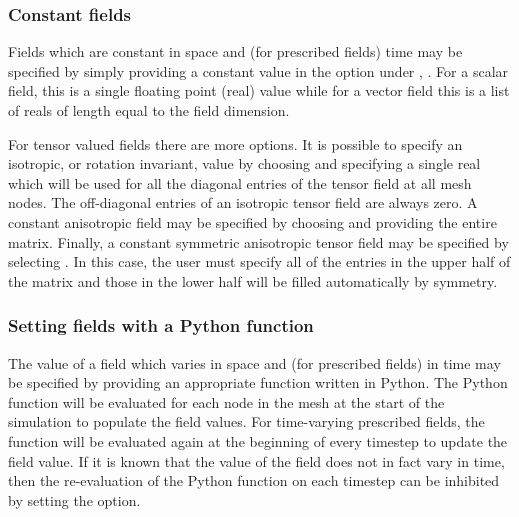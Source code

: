 \subsubsection{Constant fields}
Fields which are constant in space and (for prescribed fields) time may be
specified by simply providing a constant value in the 
option under ,
. For a scalar field, this is a single
floating point (real) value while for a vector field this is a list of reals
of length equal to the field dimension.

For tensor valued fields there are more options. It is possible to specify
an isotropic, or rotation invariant, value by choosing
 and specifying a single real which
will be used for all the diagonal entries of the tensor field at all mesh
nodes. The off-diagonal entries of an isotropic tensor field are always
zero. A constant anisotropic field may be specified by choosing
 and providing the
entire matrix. Finally, a constant symmetric anisotropic tensor field may be
specified by selecting \onlypdf\linebreak
{}. In this case, the
user must specify all of the entries in the upper half of the matrix and
those in the lower half will be filled automatically by symmetry.

\subsubsection{Setting fields with a Python function}\label{Sect:setting_with_python}
The value of a field which varies in space and (for prescribed fields) in
time may be specified by providing an appropriate function written in
Python. The Python function will be evaluated for each node in the mesh at
the start of the simulation to populate the field values. For time-varying
prescribed fields, the function will be evaluated again at the beginning of
every timestep to update the field value. If it is known that the value of
the field does not in fact vary in time, then the re-evaluation of the
Python function on each timestep can be inhibited by setting the
\onlypdf\linebreak {} option.


